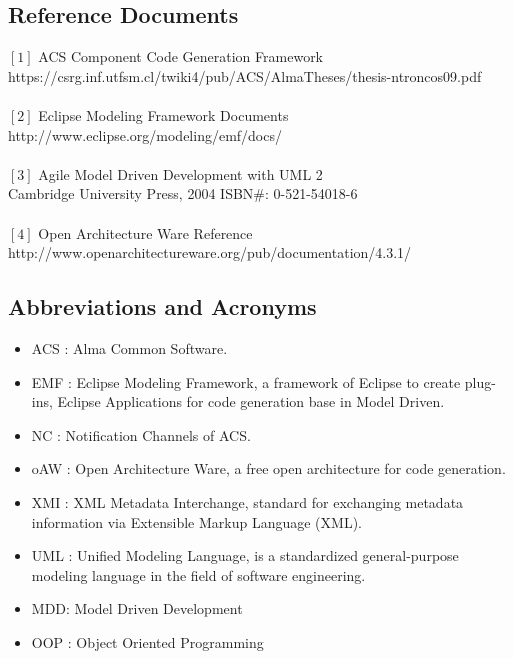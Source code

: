 \subsection{Reference Documents}
$[1]$ ACS Component Code Generation Framework\\
\hspace*{0.45cm} https://csrg.inf.utfsm.cl/twiki4/pub/ACS/AlmaTheses/thesis-ntroncos09.pdf\\
\\
$[2]$ Eclipse Modeling Framework Documents\\
\hspace*{0.45cm} http://www.eclipse.org/modeling/emf/docs/\\
\\
$[3]$ Agile Model Driven Development with UML 2\\
\hspace*{0.45cm} Cambridge University Press, 2004 ISBN\#: 0-521-54018-6\\ 
\\
$[4]$ Open Architecture Ware Reference\\
\hspace*{0.45cm} http://www.openarchitectureware.org/pub/documentation/4.3.1/

\newpage

\subsection{Abbreviations and Acronyms}
\begin{itemize}
	\item ACS : Alma Common Software.
	\item EMF : Eclipse Modeling Framework, a framework of Eclipse to create
	plug-ins, Eclipse Applications for code generation base in Model Driven.
	\item NC : Notification Channels of ACS.
	\item oAW : Open Architecture Ware, a free open architecture for code generation.
	\item XMI : XML Metadata Interchange, standard for exchanging metadata information via Extensible Markup Language (XML).
	\item UML : Unified Modeling Language, is a standardized general-purpose modeling language in the field of software engineering.
	\item MDD: Model Driven Development
	\item OOP : Object Oriented Programming
\end{itemize}

